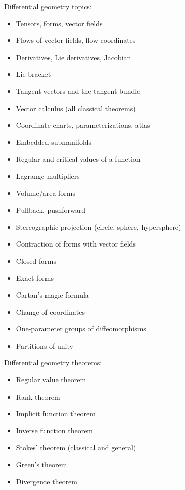 \documentclass[10pt]{article}
\numberwithin{equation}{subsection}
\begin{document}
Differential geometry topics:
\begin{itemize}
\item Tensors, forms, vector fields
\item Flows of vector fields, flow coordinates
\item Derivatives, Lie derivatives, Jacobian
\item Lie bracket
\item Tangent vectors and the tangent bundle
\item Vector calculus (all classical theorems)
\item Coordinate charts, parameterizations, atlas
\item Embedded submanifolds
\item Regular and critical values of a function
\item Lagrange multipliers
\item Volume/area forms
\item Pullback, pushforward
\item Stereographic projection (circle, sphere, hypersphere)
\item Contraction of forms with vector fields
\item Closed forms
\item Exact forms
\item Cartan's magic formula
\item Change of coordinates
\item One-parameter groups of diffeomorphisms
\item Partitions of unity
\end{itemize}

Differential geometry theorems:
\begin{itemize}
\item Regular value theorem
\item Rank theorem
\item Implicit function theorem
\item Inverse function theorem
\item Stokes' theorem (classical and general)
\item Green's theorem 
\item Divergence theorem
\end{itemize}
\end{document}
